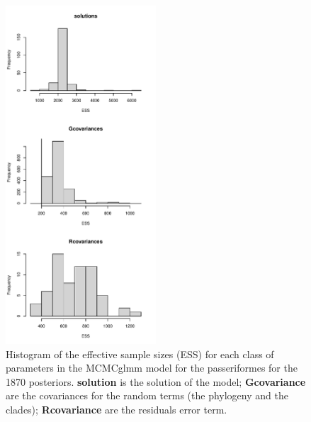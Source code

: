 \documentclass[12pt,letterpaper]{article}
\begin{document}
\begin{figure}[htbp]
\centering
   \includegraphics[width=0.5\textwidth]{Figures/parameters_ESS_passeriformes.pdf}
\caption{Histogram of the effective sample sizes (ESS) for each class of parameters in the MCMCglmm model for the passeriformes for the 1870 posteriors. \textbf{solution} is the solution of the model; \textbf{Gcovariance} are the covariances for the random terms (the phylogeny and the clades); \textbf{Rcovariance} are the residuals error term.}
\label{Fig:model_ess_passeriformes}
\end{figure}
\end{document}
